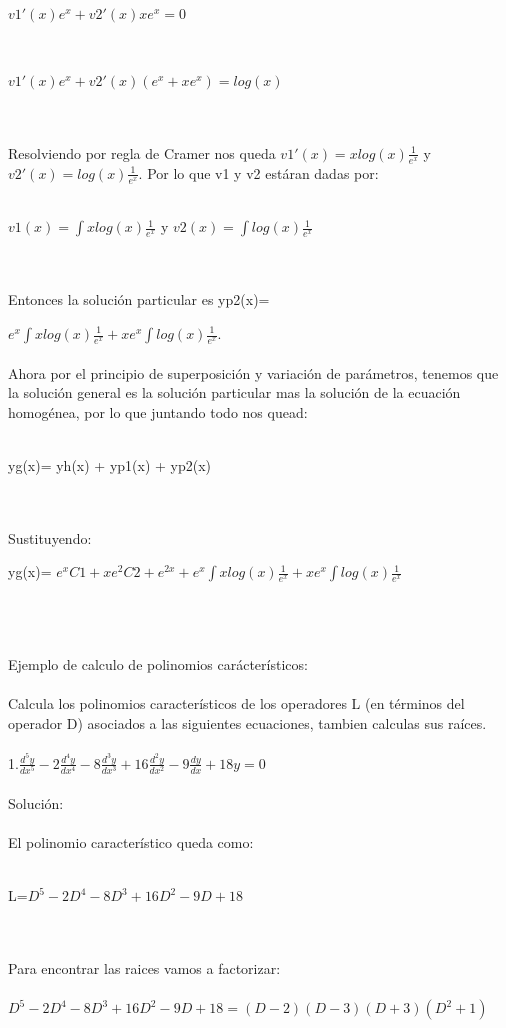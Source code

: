 \documentclass[a4paper,10pt]{article}
\begin{document}
\centerline{$v1'(x)e^x + v2'(x)xe^x = 0$}\\
\centerline{$v1'(x)e^x + v2'(x)(e^x + xe^x) = log(x)$}\\\\
Resolviendo por regla de Cramer nos queda $v1'(x)=xlog(x)\frac{1}{e^x}$ y $v2'(x)=log(x)\frac{1}{e^x}$. Por lo que v1 y v2 estáran dadas por:\\\\
\centerline{$v1(x)=\int xlog(x)\frac{1}{e^x}$ y $v2(x)=\int log(x)\frac{1}{e^x}$}\\\\
Entonces la solución particular es yp2(x)={$e^x \int xlog(x)\frac{1}{e^x} +xe^x \int log(x)\frac{1}{e^x}$.\\\\
Ahora por el principio de superposición y variación de parámetros, tenemos que la solución general es la solución particular mas la solución de la ecuación homogénea, por lo que juntando todo nos quead:\\\\
\centerline{yg(x)= yh(x) + yp1(x) + yp2(x)}\\\\
Sustituyendo:\\
\centerline{yg(x)= $e^x C1 + xe^2 C2 + e^{2x} + e^x \int xlog(x)\frac{1}{e^x} +xe^x \int log(x)\frac{1}{e^x}$}\\\\\\
Ejemplo de calculo de polinomios carácterísticos:\\\\
Calcula los polinomios característicos de los operadores L (en
términos del operador D) asociados a las siguientes ecuaciones,
tambien calculas sus raíces.\\\\
1.$\frac{d^5 y }{dx^5} - 2\frac{d^4  y}{dx^4}   - 8\frac{d^3 y}{dx^3}  + 16\frac{d^2 y}{dx^2} - 9\frac{dy}{dx}  + 18y =0$\\\\
Solución:\\\\
El polinomio característico queda como:\\\\
\centerline{L=$D^5 - 2D^4 - 8D^3 + 16D^2 - 9D + 18$}\\\\
Para encontrar las raices vamos a factorizar:\\\\
$D^5 - 2D^4 - 8D^3 + 16D^2 - 9D + 18 = (D-2)(D-3)(D+3)(D^2 + 1)$\\\\
}
\end{document}
